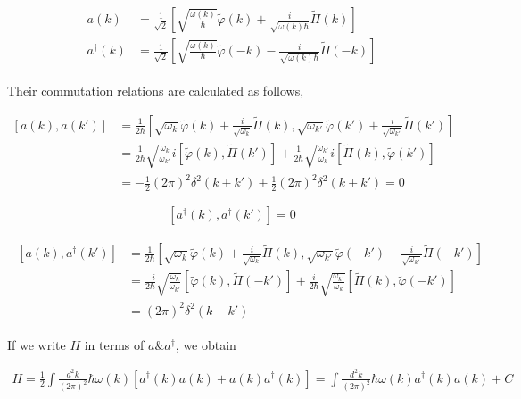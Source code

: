 \begin{align}\label{1.4.8}
\begin{split}
a(k) &= \frac{1}{\sqrt{2}}\left[\sqrt{\frac{\omega(k)}{\hbar}}\tilde{\varphi}(k)+\frac{i}{\sqrt{\omega(k)\hbar}}\tilde{\Pi}(k)\right]\\
a^\dagger(k) &= \frac{1}{\sqrt{2}}\left[\sqrt{\frac{\omega(k)}{\hbar}}\tilde{\varphi}(-k)-\frac{i}{\sqrt{\omega(k)\hbar}}\tilde{\Pi}(-k)\right]
\end{split}
\end{align}

Their commutation relations are calculated as follows, 

\[\begin{split}
[a(k),a(k')] &= \frac{1}{2\hbar}\left[\sqrt{\omega_k}\tilde{\varphi}(k)+\frac{i}{\sqrt{\omega_k}} \tilde{\Pi}(k), \sqrt{\omega_{k'}}\tilde{\varphi}(k')+\frac{i}{\sqrt{\omega_{k'}}}\tilde{\Pi}(k')\right] \\
&= \frac{1}{2\hbar}\sqrt{\frac{\omega_k}{\omega_{k'}}}i[\tilde{\varphi}(k),\tilde{\Pi}(k')] + \frac{1}{2\hbar}\sqrt{\frac{\omega_{k'}}{\omega_k}}i[\tilde{\Pi}(k),\tilde{\varphi}(k')] \\
&=-\frac{1}{2}(2\pi)^2\delta^2(k+k')+\frac{1}{2}(2\pi)^2\delta^2(k+k')= 0
\end{split}\]

\[[a^\dagger(k),a^\dagger(k')] = 0 \]

\begin{align}\begin{split}
[a(k),a^\dagger(k')] &= \frac{1}{2\hbar}\left[\sqrt{\omega_k}\tilde{\varphi}(k)+\frac{i}{\sqrt{\omega_k}}\tilde{\Pi}(k), \sqrt{\omega_{k'}}\tilde{\varphi}(-k') - \frac{i}{\sqrt{\omega_{k'}}}\tilde{\Pi}(-k')\right] \\
&= \frac{-i}{2\hbar}\sqrt{\frac{\omega_k}{\omega_{k'}}} [\tilde{\varphi}(k),\tilde{\Pi}(-k')] + \frac{i}{2\hbar}\sqrt{\frac{\omega_{k'}}{\omega_k}}[\tilde{\Pi}(k),\tilde{\varphi}(-k')] \\
&= (2\pi)^2\delta^2(k-k')
\end{split}\end{align}

If we write $H$ in terms of $a \& a^\dagger$, we obtain

\begin{align}
H = \frac{1}{2}\int \frac{d^2 k}{(2\pi)^2}\hbar\omega(k)[a^\dagger(k)a(k)+a(k)a^\dagger(k)] = \int \frac{d^2 k}{(2\pi)^2}\hbar\omega(k)a^\dagger(k)a(k)+C
\end{align}

